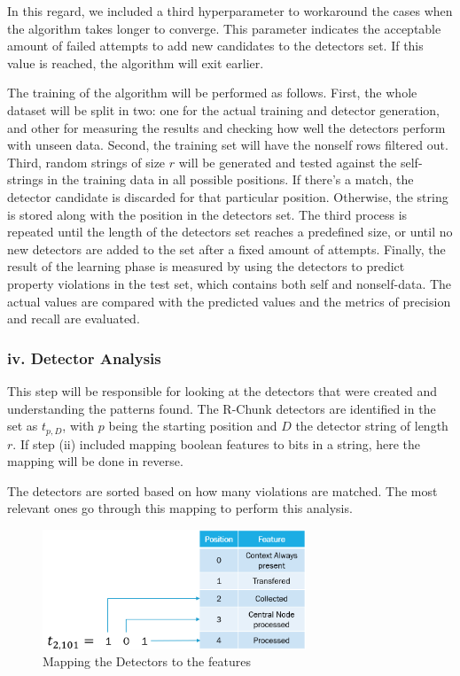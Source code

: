 In this regard, we included a third hyperparameter to workaround the cases when the algorithm takes longer to converge. This parameter indicates the acceptable amount of failed attempts to add new candidates to the detectors set. If this value is reached, the algorithm will exit earlier.

The training of the algorithm will be performed as follows. First, the whole dataset will be split in two: one for the actual training and detector generation, and other for measuring the results and checking how well the detectors perform with unseen data. Second, the training set will have the nonself rows filtered out. Third, random strings of size \(r\) will be generated and tested against the self-strings in the training data in all possible positions. If there's a match, the detector candidate is discarded for that particular position. Otherwise, the string is stored along with the position in the detectors set. The third process is repeated until the length of the detectors set reaches a predefined size, or until no new detectors are added to the set after a fixed amount of attempts. Finally, the result of the learning phase is measured by using the detectors to predict property violations in the test set, which contains both self and nonself-data. The actual values are compared with the predicted values and the metrics of precision and recall are evaluated.


\subsubsection{iv. Detector Analysis}

This step will be responsible for looking at the detectors that were created and understanding the patterns found. The R-Chunk detectors are identified in the set as \(t_{p, D}\), with \(p\) being the starting position and \(D\) the detector string of length \(r\). If step (ii) included mapping boolean features to bits in a string, here the mapping will be done in reverse. 

The detectors are sorted based on how many violations are matched. The most relevant ones go through this mapping to perform this analysis.

\begin{figure}[!h]
	\centering
	\includegraphics[width=0.7\textwidth, keepaspectratio]{img/detectoAnalysis.png}
	\caption{Mapping the Detectors to the features}
	\label{fig:detectoAnalysis}
\end{figure}

